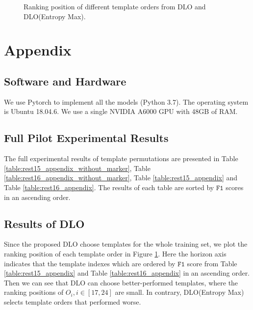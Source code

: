 \documentclass[11pt]{article}
\begin{document}



\clearpage
\appendix



\begin{figure}[t]
\centering
{}
\caption{Ranking position of different template orders from DLO and DLO(Entropy Max).}
\label{fig:figure_DLO}
\end{figure}


\section{Appendix}
\subsection{Software and Hardware}
We use Pytorch to implement all the models (Python 3.7). The operating system is Ubuntu 18.04.6. We use a single NVIDIA A6000 GPU with 48GB of RAM.






\subsection{Full Pilot Experimental Results}
The full experimental results of template permutations are presented in Table \ref{table:rest15_appendix_without_marker}, Table \ref{table:rest16_appendix_without_marker}, Table \ref{table:rest15_appendix} and Table \ref{table:rest16_appendix}. The results of each table are sorted by $\mathtt{F1}$ scores in an ascending order.



\subsection{Results of DLO}
Since the proposed DLO choose templates for the whole training set, we plot the ranking position of each template order in Figure \ref{fig:figure_DLO}. Here the horizon axis indicates that the template indexes which are ordered by $\mathtt{F1}$ score from Table \ref{table:rest15_appendix} and Table \ref{table:rest16_appendix} in an ascending order. Then we can see that DLO can choose better-performed templates, where the ranking positions of $O_i, i\in{[17,24]}$ are small. In contrary, DLO(Entropy Max) selects template orders that performed worse. 
\end{document}
